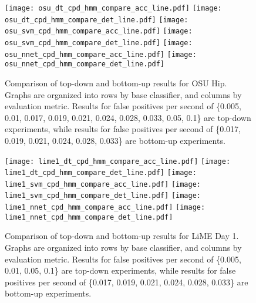 \begin{figure}[h]
 \centering
 \texttt{[image: osu\_dt\_cpd\_hmm\_compare\_acc\_line.pdf]} \hspace{1em}\vspace{1em}
 \texttt{[image: osu\_dt\_cpd\_hmm\_compare\_det\_line.pdf]} 
 \texttt{[image: osu\_svm\_cpd\_hmm\_compare\_acc\_line.pdf]} \hspace{1em}\vspace{1em}
 \texttt{[image: osu\_svm\_cpd\_hmm\_compare\_det\_line.pdf]}
 \texttt{[image: osu\_nnet\_cpd\_hmm\_compare\_acc\_line.pdf]} \hspace{1em}
 \texttt{[image: osu\_nnet\_cpd\_hmm\_compare\_det\_line.pdf]}
 \caption{Comparison of top-down and bottom-up results for OSU Hip.
  Graphs are organized into rows by base classifier, and columns by evaluation
  metric. Results for false positives per second of \{0.005, 0.01, 0.017, 0.019, 0.021, 0.024, 0.028, 0.033, 0.05, 0.1\} are 
  top-down experiments, while results for false positives per second of
  \{0.017, 0.019, 0.021, 0.024, 0.028, 0.033\} are bottom-up experiments.}
 \label{fig:osu_compare_cpd_hmm}
\end{figure}

\begin{figure}[h]
 \centering
 \texttt{[image: lime1\_dt\_cpd\_hmm\_compare\_acc\_line.pdf]} \hspace{1em}\vspace{1em}
 \texttt{[image: lime1\_dt\_cpd\_hmm\_compare\_det\_line.pdf]} 
 \texttt{[image: lime1\_svm\_cpd\_hmm\_compare\_acc\_line.pdf]} \hspace{1em}\vspace{1em}
 \texttt{[image: lime1\_svm\_cpd\_hmm\_compare\_det\_line.pdf]}
 \texttt{[image: lime1\_nnet\_cpd\_hmm\_compare\_acc\_line.pdf]} \hspace{1em}
 \texttt{[image: lime1\_nnet\_cpd\_hmm\_compare\_det\_line.pdf]}
 \caption{Comparison of top-down and bottom-up results for LiME Day 1.
  Graphs are organized into rows by base classifier, and columns by evaluation
  metric. Results for false positives per second of \{0.005, 0.01, 0.05, 0.1\} are
  top-down experiments, while results for false positives per second of
  \{0.017, 0.019, 0.021, 0.024, 0.028, 0.033\} are bottom-up experiments.}
 \label{fig:lime1_compare_cpd_hmm}
\end{figure}

